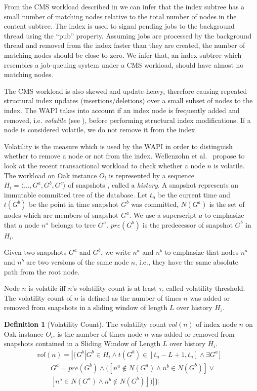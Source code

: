 \documentclass[abstracton,12pt]{scrartcl}
\theoremstyle{definition}
\newtheorem{definition}{Definition}
\begin{document}
From the CMS workload described in  we can 
infer that the index subtree has a small number of
matching nodes relative to the total number of nodes in the content subtree. The index is
 used to signal pending jobs to the background thread using
the ``pub'' property. Assuming jobs are processed by
the background thread and removed from the index faster than they are created,
the number of matching nodes should be close to zero. We infer that, an index subtree
which resembles a job-queuing system under a CMS workload, should have
almost no matching nodes. 

The CMS workload is also skewed and update-heavy, therefore causing repeated structural index
updates (insertions/deletions) over a small subset of nodes to the index.
The WAPI takes into account if an index node is frequently added and removed,
i.e. \textit{volatile} (see ), before performing structural
index modifications. If a node is considered volatile, we do not remove it from the index.

Volatility is the measure which is used by the WAPI in order to distinguish
whether to remove a node or not from the index.
Wellenzohn et al.~\cite{KW17} propose to look at the recent transactional
workload to check whether a node $n$ is volatile. The workload on Oak instance
$O_i$ is represented by a sequence $H_i = \langle \ldots, G^a, G^b, G^c
\rangle$ of snapshots \cite{Hainaut2009-snapshot}, called a \textit{history}. 
A snapshot represents an immutable
committed tree of the database. Let $t_n$ be the current time and
$t(G^b)$ be the point in time snapshot $G^b$ was committed, $N(G^a)$ is the
set of nodes which are members of snapshot $G^a$. We use a superscript $a$
to emphasize that a node $n^a$ belongs to tree $G^a$. $pre(G^b)$ is the
predecessor of snapshot $G^b$ in $H_i$.

Given two snapshots $G^a$ and $G^b$, we write $n^a$ and $n^b$ to emphasize that
nodes $n^a$ and $n^b$ are two versions of the same node $n$, i.e., they have
the same absolute path from the root node.

Node $n$ is volatile iff $n$'s volatility count is at least $\tau$, called
volatility threshold. The volatility count of $n$ is defined as the number of
times $n$ was added or removed from snapshots in a sliding window of length
$L$ over history $H_i$.

\begin{definition}[Volatility Count]
  The volatility count $vol(n)$ of index node $n$ on Oak instance $O_i$, is the number of
  times node $n$ was added or removed from snapshots contained in a Sliding
  Window of Length $L$ over history $H_i$.
  \begin{align*}
    vol(n) = | \{ G^b | G^b \in H_i \land t(G^b) \in [t_n-L+1, t_n] \land \exists G^a[ \\
    \qquad G^a = pre(G^b) \land ([n^a \notin N(G^a) \land n^b \in N(G^b)]\lor \\
    \qquad [n^a \in N(G^a) \land n^b \notin N(G^b)] )]\} |
  \end{align*}
  \label{def:vol_count}
\end{definition}
\end{document}
